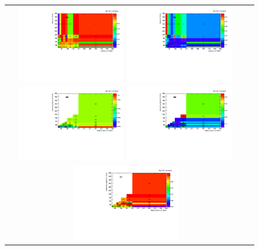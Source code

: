 \begin{figure}[htb]
  \begin{center}
    \begin{tabular}{cc}
      \includegraphics[width=0.45\textwidth]{fig_2016preVFP_TrigSF/h2D_lepABpt_emu.pdf}
      \includegraphics[width=0.45\textwidth]{fig_2016preVFP_TrigSF/h2D_lepABpt_emu_BinErrors.pdf}\\       
      \includegraphics[width=0.45\textwidth]{fig_2016preVFP_TrigSF/h2D_lepABpt_ee.pdf}
      \includegraphics[width=0.45\textwidth]{fig_2016preVFP_TrigSF/h2D_lepABpt_ee_BinErrors.pdf}\\
      \includegraphics[width=0.45\textwidth]{fig_2016preVFP_TrigSF/h2D_lepABpt_mumu.pdf}

\end{tabular}
\end{center}
\end{figure}
